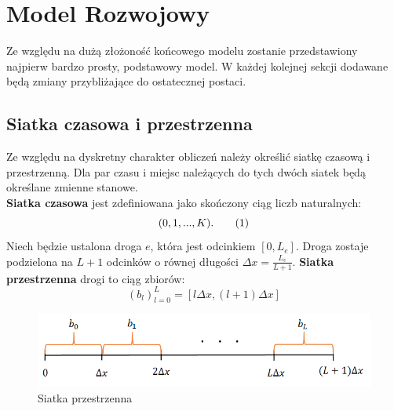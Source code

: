 \documentclass[12pt]{book}
\newcommand\addtag{\refstepcounter{equation}
\tag{\theequation}}
\begin{document}
\section{Model Rozwojowy}
Ze względu na dużą złożoność końcowego modelu zostanie przedstawiony najpierw bardzo prosty, podstawowy model. W każdej kolejnej sekcji dodawane będą zmiany przybliżające do ostatecznej postaci.
\subsection{Siatka czasowa i przestrzenna}
Ze względu na dyskretny charakter obliczeń należy określić siatkę czasową i przestrzenną. Dla par czasu i miejsc należących do tych dwóch siatek będą określane zmienne stanowe. \\ \textbf{Siatka czasowa} jest zdefiniowana jako skończony ciąg liczb naturalnych:
\[(0,1,...,K). \addtag \]
Niech będzie ustalona droga $e$, która jest odcinkiem $[0,L_e]$. Droga zostaje podzielona na $L+1$ odcinków o równej długości $\Delta x=\frac{L_e}{L+1}$. \textbf{Siatka przestrzenna} drogi to ciąg zbiorów:
\[(b_l)_{l=0}^{L}=[l\Delta x,(l+1)\Delta x]\]
\begin{figure}[H]
  \centering
    \includegraphics[width=14cm]{siatka_przestrzenna}
 \caption{Siatka przestrzenna}
 \label{fig:siatka_przestrzenna}
\end{figure}

\end{document}

